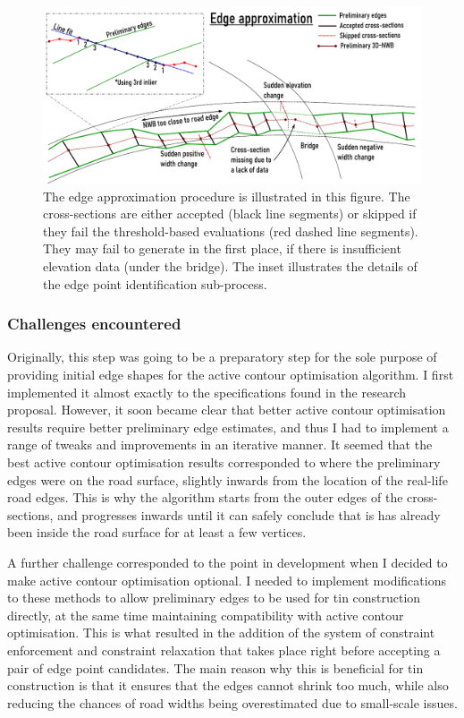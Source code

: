 \begin{figure}
    \centering
    \includegraphics[width=\linewidth]{final_report/figs/edge_estimation_illu.pdf}
    \caption[Illustration of the edge approximation step]{The edge approximation procedure is illustrated in this figure. The cross-sections are either accepted (black line segments) or skipped if they fail the threshold-based evaluations (red dashed line segments). They may fail to generate in the first place, if there is insufficient elevation data (under the bridge). The inset illustrates the details of the edge point identification sub-process.}
    \label{fig:edgeapproximation_illu}
\end{figure}

\subsubsection{Challenges encountered}

Originally, this step was going to be a preparatory step for the sole purpose of providing initial edge shapes for the active contour optimisation algorithm. I first implemented it almost exactly to the specifications found in the research proposal. However, it soon became clear that better active contour optimisation results require better preliminary edge estimates, and thus I had to implement a range of tweaks and improvements in an iterative manner. It seemed that the best active contour optimisation results corresponded to where the preliminary edges were on the road surface, slightly inwards from the location of the real-life road edges. This is why the algorithm starts from the outer edges of the cross-sections, and progresses inwards until it can safely conclude that is has already been inside the road surface for at least a few vertices.

A further challenge corresponded to the point in development when I decided to make active contour optimisation optional. I needed to implement modifications to these methods to allow preliminary edges to be used for \ac{tin} construction directly, at the same time maintaining compatibility with active contour optimisation. This is what resulted in the addition of the system of constraint enforcement and constraint relaxation that takes place right before accepting a pair of edge point candidates. The main reason why this is beneficial for \ac{tin} construction is that it ensures that the edges cannot shrink too much, while also reducing the chances of road widths being overestimated due to small-scale issues.

